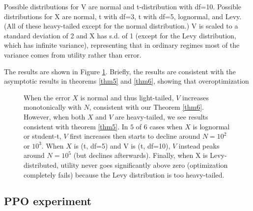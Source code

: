 \documentclass{article}
\begin{document}
Possible distributions for V are normal and t-distribution with df=10.
Possible distributions for X are normal, t with df=3, t with df=5, lognormal, and Levy. (All of these heavy-tailed except for the normal distribution.)
V is scaled to a standard deviation of 2 and X has s.d. of 1 (except for the Levy distribution, which has infinite variance), representing that in ordinary regimes most of the variance comes from utility rather than error.

The results are shown in Figure \ref{fig:best-of-n}. Briefly, the results are consistent with the asymptotic results in theorems \ref{thm5} and \ref{thm6}, showing that overoptimization

\begin{figure}
    \centering
    \caption{When the error $X$ is normal and thus light-tailed, $V$ increases monotonically with $N$, consistent with our Theorem \ref{thm6}.
    However, when both $X$ and $V$ are heavy-tailed, we see results consistent with theorem \ref{thm5}. In $5$ of $6$ cases when $X$ is lognormal or student-t, $V$ first increases then starts to decline around $N=10^2$ or $10^3$. When $X$ is (t, df=5) and V is (t, df=10), $V$ instead peaks around $N=10^5$ (but declines afterwards). Finally, when X is Levy-distributed, utility never goes significantly above zero (optimization completely fails) because the Levy distribution is too heavy-tailed.}
    \label{fig:best-of-n}
\end{figure}

\subsection{PPO experiment}
\end{document}
